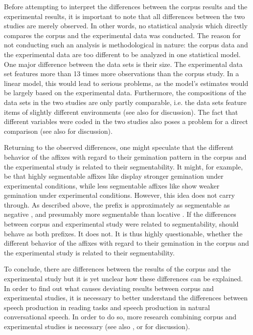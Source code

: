Before attempting to interpret the differences between the corpus results and the experimental results, it is important to note that all differences between the two studies are merely observed. In other words, no statistical analysis which directly compares the corpus and the experimental data was conducted. The reason for not conducting such an analysis is methodological in nature: the corpus data and the experimental data are too different to be analyzed in one statistical model. 
One major difference between the data sets is their size. The experimental data set features more than 13 times more observations than the corpus study. In a linear model, this would lead to serious problems, as the model's estimates would be largely based on the experimental data.
 Furthermore, the compositions of the data sets in the two studies are only partly comparable, i.e. the data sets feature items of slightly different environments (see also  for discussion). The fact that different variables were coded in the two studies also poses a problem for a direct comparison (see also  for discussion).

Returning to the observed differences, one might speculate that the different behavior of the affixes with regard to their gemination pattern in the corpus and the experimental study is related to their segmentability. It might, for example, be that highly segmentable affixes like  display stronger gemination under experimental conditions, while less segmentable affixes like  show weaker gemination under experimental conditions. However, this idea does not carry through. As described above, the prefix  is approximately as segmentable as negative , and presumably more segmentable than locative . If the differences between corpus and experimental study were related to segmentability,  should behave as both prefixes. It does not. %
It is thus highly questionable, whether the different behavior of the affixes with regard to their gemination in the corpus and the experimental study is related to their segmentability.

To conclude, there are differences between the results of the corpus and the experimental study but it is yet unclear how these differences can be explained. In order to find out what causes deviating results between corpus and experimental studies, it is necessary to better understand the differences between speech production in reading tasks and speech production in natural conversational speech. In order to do so, more research combining corpus and experimental studies is necessary (see also , or \cite{Arppe.2007} for discussion). 





